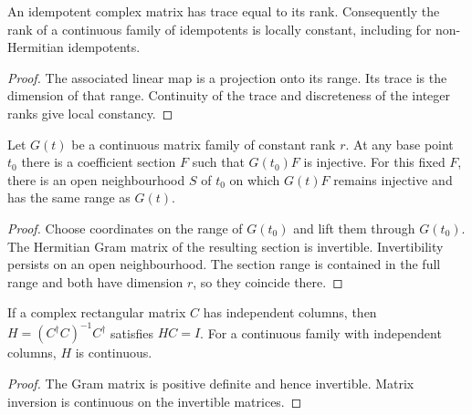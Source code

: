 \begin{lemma}
    \label{thm:spt_idempotent_rank}
    \leanok
    An idempotent complex matrix has trace equal to its rank.
    Consequently the rank of a continuous family of idempotents is
    locally constant, including for non-Hermitian idempotents.
\end{lemma}

\begin{proof}
    \leanok
    The associated linear map is a projection onto its range.
    Its trace is the dimension of that range. Continuity of the trace
    and discreteness of the integer ranks give local constancy.
\end{proof}

\begin{lemma}
    \label{thm:spt_trace_quotient_fixed_section}
    \leanok
    Let $G(t)$ be a continuous matrix family of constant rank $r$.
    At any base point $t_0$ there is a coefficient section $F$ such
    that $G(t_0)F$ is injective. For this fixed $F$, there is an open
    neighbourhood $S$ of $t_0$ on which $G(t)F$ remains injective and
    has the same range as $G(t)$.
\end{lemma}

\begin{proof}
    \leanok
    Choose coordinates on the range of $G(t_0)$ and lift them through
    $G(t_0)$. The Hermitian Gram matrix of the resulting section is
    invertible. Invertibility persists on an open neighbourhood.
    The section range is contained in the full range and both have
    dimension $r$, so they coincide there.
\end{proof}

\begin{lemma}
    \label{thm:spt_gram_left_inverse}
    \leanok
    If a complex rectangular matrix $C$ has independent columns, then
    $H=(C^\dagger C)^{-1}C^\dagger$ satisfies $HC=I$.
    For a continuous family with independent columns, $H$ is continuous.
\end{lemma}

\begin{proof}
    \leanok
    The Gram matrix is positive definite and hence invertible.
    Matrix inversion is continuous on the invertible matrices.
\end{proof}

